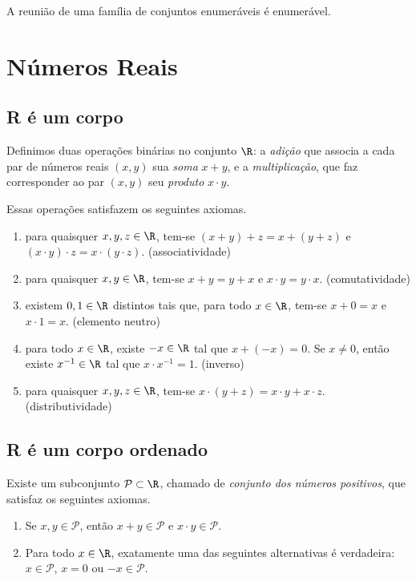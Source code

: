 \documentclass{article}
\begin{document}
\begin{cor}
    A reunião de uma família de conjuntos enumeráveis é enumerável.
\end{cor}

\section{Números Reais}

\subsection{R é um corpo}

\begin{defn} 
    Definimos duas operações binárias no conjunto \(\R\): a \emph{adição} que associa a cada par de números reais \((x,y)\) sua \emph{soma} \(x+y\), e a \emph{multiplicação}, que faz corresponder ao par \((x,y)\) seu \emph{produto} \(x \cdot y\).
\end{defn}

Essas operações satisfazem os seguintes axiomas.
\begin{enumerate}
    \item [\textbf{AI}] para quaisquer \(x, y, z \in \R\), tem-se \((x + y) + z = x + (y + z)\) e \((x \cdot y) \cdot z = x \cdot (y \cdot z)\). \hfill (associatividade)
    \item [\textbf{AII}] para quaisquer \(x, y \in \R\), tem-se \(x + y = y + x\) e \(x \cdot y = y \cdot x\). \hfill (comutatividade)
    \item [\textbf{AIII}] existem \(0, 1 \in \R\) distintos tais que, para todo \(x \in \R\), tem-se \(x + 0 = x\) e \(x \cdot 1 = x\). \hfill (elemento neutro)
    \item [\textbf{AIV}] para todo \(x \in \R\), existe \(-x \in \R\) tal que \(x + (-x) = 0\). Se \(x \neq 0\), então existe \(x^{-1} \in \R\) tal que \(x \cdot x^{-1} = 1\). \hfill (inverso)
    \item [\textbf{AV}] para quaisquer \(x, y, z \in \R\), tem-se \(x \cdot (y + z) = x \cdot y + x \cdot z\). \hfill (distributividade)
\end{enumerate}

\subsection{R é um corpo ordenado}

Existe um subconjunto \(\mathcal{P} \subset \R\), chamado de \emph{conjunto dos números positivos}, que satisfaz os seguintes axiomas.
\begin{enumerate}
    \item [\textbf{P1}] Se \(x, y \in \mathcal{P}\), então \(x + y \in \mathcal{P}\) e \(x \cdot y \in \mathcal{P}\).
    \item [\textbf{P2}] Para todo \(x \in \R\), exatamente uma das seguintes alternativas é verdadeira: \(x \in \mathcal{P}\), \(x = 0\) ou \(-x \in \mathcal{P}\).
\end{enumerate}
\end{document}
